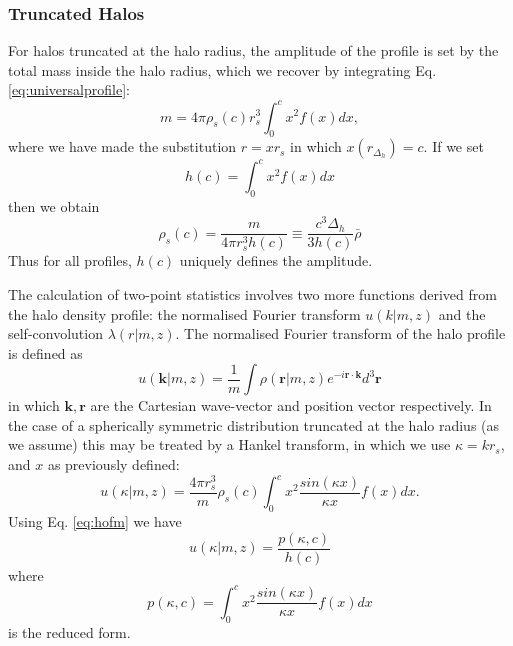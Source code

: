\documentclass[5p,aas_macros]{elsarticle}
\begin{document}

\subsubsection{Truncated Halos}
For halos truncated at the halo radius, the amplitude of the profile is set by the total mass inside the halo radius, which we recover by integrating Eq. \ref{eq:universalprofile}:
\begin{equation}
\label{eq:minrv}
m = 4\pi \rho_s(c) r_s^3 \int_0^c x^2 f(x) dx,
\end{equation}
where we have made the substitution $r = xr_s$ in which $x(r_{\Delta_h}) = c$.
If we set
\begin{equation}
\label{eq:hofc}
h(c) = \int_0^c x^2 f(x) dx
\end{equation}
then we obtain
\begin{equation}
\label{eq:hofm}
\rho_s(c) = \frac{m}{4 \pi r_s^3 h(c)} \equiv \frac{c^3 \Delta_h}{3h(c)}\bar{\rho}
\end{equation}
Thus for all profiles, $h(c)$ uniquely defines the amplitude.

The calculation of two-point statistics involves two more functions derived from the halo density profile: the normalised Fourier transform $u(k|m,z)$ and the self-convolution $\lambda(r|m,z)$. The normalised Fourier transform of the halo profile is defined as \citep{Cooray2002}
\begin{equation}
\label{eq:ugeneral}
u(\mathbf{k}|m,z) = \frac{1}{m}\int \rho(\mathbf{r}|m,z) e^{-i\mathbf{r}\cdot\mathbf{k}}d^3\mathbf{r}
\end{equation}
in which $\mathbf{k},\mathbf{r}$ are the Cartesian wave-vector and position vector respectively.
In the case of a spherically symmetric distribution truncated at the halo radius (as we assume) this may be treated by a Hankel transform, in which we use $\kappa = kr_s$, and $x$ as previously defined:
\begin{equation}
u(\kappa|m,z) = \frac{4\pi r_s^3}{m}\rho_s(c)\int_0^c x^2 \frac{sin(\kappa x)}{\kappa x}f(x) dx.
\end{equation}
Using Eq. \ref{eq:hofm} we have
\begin{equation}
\label{eq:uspherical}
u(\kappa |m,z) = \frac{p(\kappa,c)}{h(c)}
\end{equation}
where
\begin{equation}
\label{eq:pofck}
p(\kappa,c) = \int_0^c x^2 \frac{sin(\kappa x)}{\kappa x}f(x) dx
\end{equation}
is the reduced form.
\end{document}
